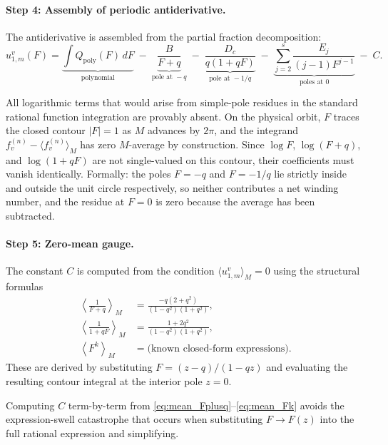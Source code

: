 \documentclass[11pt]{article}
\begin{document}
\paragraph{Step 4: Assembly of periodic antiderivative.}
The antiderivative is assembled from the partial fraction decomposition:
\begin{equation}
u_{1,m}^v(F)
= \underbrace{\int Q_{\mathrm{poly}}(F)\,dF}_{\text{polynomial}}
\;-\;
\underbrace{\frac{B}{F+q}}_{\text{pole at } -q}
\;-\;
\underbrace{\frac{D_c}{q(1+qF)}}_{\text{pole at } -1/q}
\;-\;
\underbrace{\sum_{j=2}^{s} \frac{E_j}{(j-1)F^{j-1}}}_{\text{poles at } 0}
\;-\; C.
\label{eq:antiderivative_assembly}
\end{equation}

All logarithmic terms that would arise from simple-pole residues in the
standard rational function integration are provably absent.
On the physical orbit, $F$ traces the closed contour $|F| = 1$ as $M$ advances
by $2\pi$, and the integrand $f^{(n)}_v - \langle f^{(n)}_v \rangle_M$ has
zero $M$-average by construction. Since $\log F$, $\log(F+q)$, and
$\log(1+qF)$ are not single-valued on this contour, their coefficients
must vanish identically. Formally: the poles $F = -q$ and $F = -1/q$ lie
strictly inside and outside the unit circle respectively, so neither
contributes a net winding number, and the residue at $F = 0$ is zero because
the average has been subtracted.

\paragraph{Step 5: Zero-mean gauge.}
The constant $C$ is computed from the condition
$\langle u_{1,m}^v \rangle_M = 0$ using the structural formulas
\begin{align}
\left\langle \frac{1}{F+q} \right\rangle_M
&= \frac{-q(2+q^2)}{(1-q^2)(1+q^2)},
\label{eq:mean_Fplusq}\\
\left\langle \frac{1}{1+qF} \right\rangle_M
&= \frac{1+2q^2}{(1-q^2)(1+q^2)},
\label{eq:mean_1plusqF}\\
\left\langle F^k \right\rangle_M
&= \text{(known closed-form expressions)}.
\label{eq:mean_Fk}
\end{align}
These are derived by substituting $F = (z-q)/(1-qz)$ and evaluating the
resulting contour integral at the interior pole $z = 0$.

Computing $C$ term-by-term from
\eqref{eq:mean_Fplusq}--\eqref{eq:mean_Fk} avoids the expression-swell
catastrophe that occurs when substituting $F \to F(z)$ into the full
rational expression and simplifying.
\end{document}
